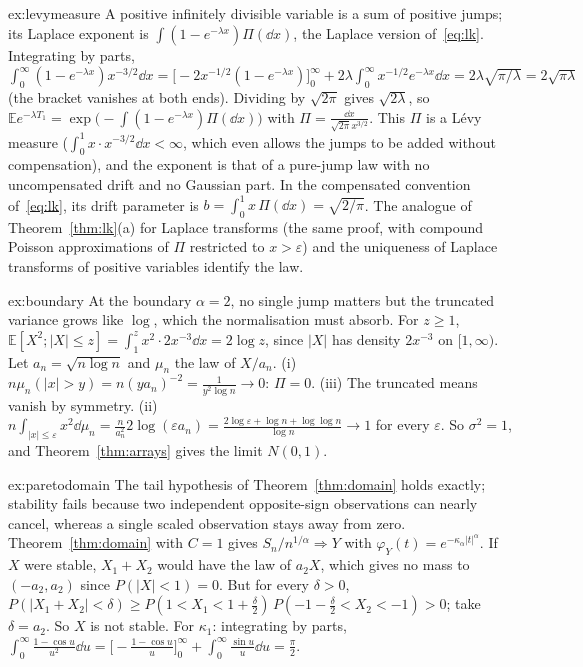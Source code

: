 \begin{solution}{ex:levymeasure}
\idea A positive infinitely divisible variable is a sum of positive jumps; its Laplace exponent is $\int(1-e^{-\lambda x})\Pi(\dd x)$, the Laplace version of~\eqref{eq:lk}.
\writeup Integrating by parts, $\int_0^\infty(1-e^{-\lambda x})x^{-3/2}\dd x=\bigl[-2x^{-1/2}(1-e^{-\lambda x})\bigr]_0^\infty+2\lambda\int_0^\infty x^{-1/2}e^{-\lambda x}\dd x=2\lambda\sqrt{\pi/\lambda}=2\sqrt{\pi\lambda}$
(the bracket vanishes at both ends). Dividing by $\sqrt{2\pi}$ gives $\sqrt{2\lambda}$, so $\mathbb Ee^{-\lambda T_1}=\exp\bigl(-\int(1-e^{-\lambda x})\Pi(\dd x)\bigr)$ with $\Pi=\frac{\dd x}{\sqrt{2\pi}x^{3/2}}$.
This $\Pi$ is a L\'evy measure ($\int_0^1x\cdot x^{-3/2}\dd x<\infty$, which even allows the jumps to be added without compensation), and the exponent is that of a
pure-jump law with no uncompensated drift and no Gaussian part. In the compensated convention of~\eqref{eq:lk}, its drift parameter is $b=\int_0^1x\,\Pi(\dd x)=\sqrt{2/\pi}$. The analogue of Theorem~\ref{thm:lk}(a) for Laplace transforms (the same proof, with compound Poisson
approximations of $\Pi$ restricted to $x>\varepsilon$) and the uniqueness of Laplace transforms of positive variables identify the law.
\end{solution}

\begin{solution}{ex:boundary}
\idea At the boundary $\alpha=2$, no single jump matters but the truncated variance grows like $\log$, which the normalisation must absorb.
\writeup For $z\ge1$, $\mathbb E[X^2;|X|\le z]=\int_1^zx^2\cdot2x^{-3}\dd x=2\log z$, since $|X|$ has density $2x^{-3}$ on $[1,\infty)$. Let $a_n=\sqrt{n\log n}$ and $\mu_n$ the law of
$X/a_n$. (i) $n\mu_n(|x|>y)=n(ya_n)^{-2}=\frac1{y^2\log n}\to0$: $\Pi=0$. (iii) The truncated means vanish by symmetry. (ii)
$n\int_{|x|\le\varepsilon}x^2\dd\mu_n=\frac n{a_n^2}2\log(\varepsilon a_n)=\frac{2\log\varepsilon+\log n+\log\log n}{\log n}\to1$ for every $\varepsilon$. So $\sigma^2=1$, and
Theorem~\ref{thm:arrays} gives the limit $N(0,1)$.
\end{solution}

\begin{solution}{ex:paretodomain}
\idea The tail hypothesis of Theorem~\ref{thm:domain} holds exactly; stability fails because two independent opposite-sign observations can nearly cancel, whereas a single scaled observation stays away from zero.
\writeup Theorem~\ref{thm:domain} with $C=1$ gives $S_n/n^{1/\alpha}\Rightarrow Y$ with $\varphi_Y(t)=e^{-\kappa_\alpha|t|^\alpha}$. If $X$ were stable, $X_1+X_2$ would have the law of
$a_2X$, which gives no mass to $(-a_2,a_2)$ since $P(|X|<1)=0$. But for every $\delta>0$,
$P(|X_1+X_2|<\delta)\ge P(1<X_1<1+\frac\delta2)\,P(-1-\frac\delta2<X_2<-1)>0$; take $\delta=a_2$. So $X$ is not stable. For $\kappa_1$: integrating by parts,
$\int_0^\infty\frac{1-\cos u}{u^2}\dd u=\bigl[-\frac{1-\cos u}u\bigr]_0^\infty+\int_0^\infty\frac{\sin u}u\dd u=\frac\pi2$.
\end{solution}

